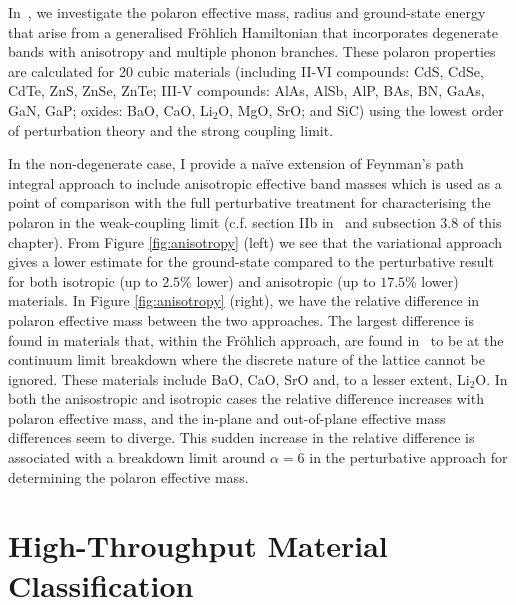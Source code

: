 In~\cite{guster_frohlich_2021}, we investigate the polaron effective mass, radius and ground-state energy that arise from a generalised Fr\"ohlich Hamiltonian that incorporates degenerate bands with anisotropy and multiple phonon branches. These polaron properties are calculated for 20 cubic materials (including II-VI compounds: CdS, CdSe, CdTe, ZnS, ZnSe, ZnTe; III-V compounds: AlAs, AlSb, AlP, BAs, BN, GaAs, GaN, GaP; oxides: BaO, CaO, Li$_2$O, MgO, SrO; and SiC) using the lowest order of perturbation theory and the strong coupling limit. \newline

In the non-degenerate case, I provide a na\"ive extension of Feynman's path integral approach to include anisotropic effective band masses which is used as a point of comparison with the full perturbative treatment for characterising the polaron in the weak-coupling limit (c.f. section IIb in~\cite{guster_frohlich_2021} and subsection 3.8 of this chapter). From Figure \ref{fig:anisotropy} (left) we see that the variational approach gives a lower estimate for the ground-state compared to the perturbative result for both isotropic (up to $2.5$\% lower) and anisotropic (up to $17.5$\% lower) materials. In Figure \ref{fig:anisotropy} (right), we have the relative difference in polaron effective mass between the two approaches. The largest difference is found in materials that, within the Fr\"ohlich approach, are found in~\cite{guster_frohlich_2021} to be at the continuum limit breakdown where the discrete nature of the lattice cannot be ignored. These materials include BaO, CaO, SrO and, to a lesser extent, Li$_2$O. In both the anisostropic and isotropic cases the relative difference increases with polaron effective mass, and the in-plane and out-of-plane effective mass differences seem to diverge. This sudden increase in the relative difference is associated with a breakdown limit around $\alpha = 6$ in the perturbative approach for determining the polaron effective mass.

\section{High-Throughput Material Classification}
\label{sec:chap-sixth-fourth}